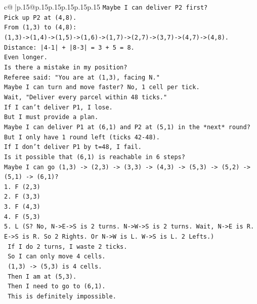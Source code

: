 \documentclass{article}
\begin{document}
{\begin{supertabular}{c@{$\;$}|p{.15\linewidth}@{}p{.15\linewidth}p{.15\linewidth}p{.15\linewidth}p{.15\linewidth}p{.15\linewidth}}
{{{\texttt{Maybe I can deliver P2 first?} \\
\texttt{Pick up P2 at (4,8).} \\
\texttt{From (1,3) to (4,8):} \\
\texttt{(1,3){-}>(1,4){-}>(1,5){-}>(1,6){-}>(1,7){-}>(2,7){-}>(3,7){-}>(4,7){-}>(4,8).} \\
\texttt{Distance: |4{-}1| + |8{-}3| = 3 + 5 = 8.} \\
\texttt{Even longer.} \\
\texttt{Is there a mistake in my position?} \\
\texttt{Referee said: "You are at (1,3), facing N."} \\
\texttt{Maybe I can turn and move faster? No, 1 cell per tick.} \\
\texttt{Wait, "Deliver every parcel within 48 ticks."} \\
\texttt{If I can't deliver P1, I lose.} \\
\texttt{But I must provide a plan.} \\
\texttt{Maybe I can deliver P1 at (6,1) and P2 at (5,1) in the *next* round?} \\
\texttt{But I only have 1 round left (ticks 42{-}48).} \\
\texttt{If I don't deliver P1 by t=48, I fail.} \\
\texttt{Is it possible that (6,1) is reachable in 6 steps?} \\
\texttt{Maybe I can go (1,3) {-}> (2,3) {-}> (3,3) {-}> (4,3) {-}> (5,3) {-}> (5,2) {-}> (5,1) {-}> (6,1)?} \\
\texttt{1. F (2,3)} \\
\texttt{2. F (3,3)} \\
\texttt{3. F (4,3)} \\
\texttt{4. F (5,3)} \\
\texttt{5. L (S? No, N{-}>E{-}>S is 2 turns. N{-}>W{-}>S is 2 turns. Wait, N{-}>E is R. E{-}>S is R. So 2 Rights. Or N{-}>W is L. W{-}>S is L. 2 Lefts.)} \\
\texttt{   If I do 2 turns, I waste 2 ticks.} \\
\texttt{   So I can only move 4 cells.} \\
\texttt{   (1,3) {-}> (5,3) is 4 cells.} \\
\texttt{   Then I am at (5,3).} \\
\texttt{   Then I need to go to (6,1).} \\
\texttt{   This is definitely impossible.} \\
\\ 
}}}
\end{supertabular}}
\end{document}
